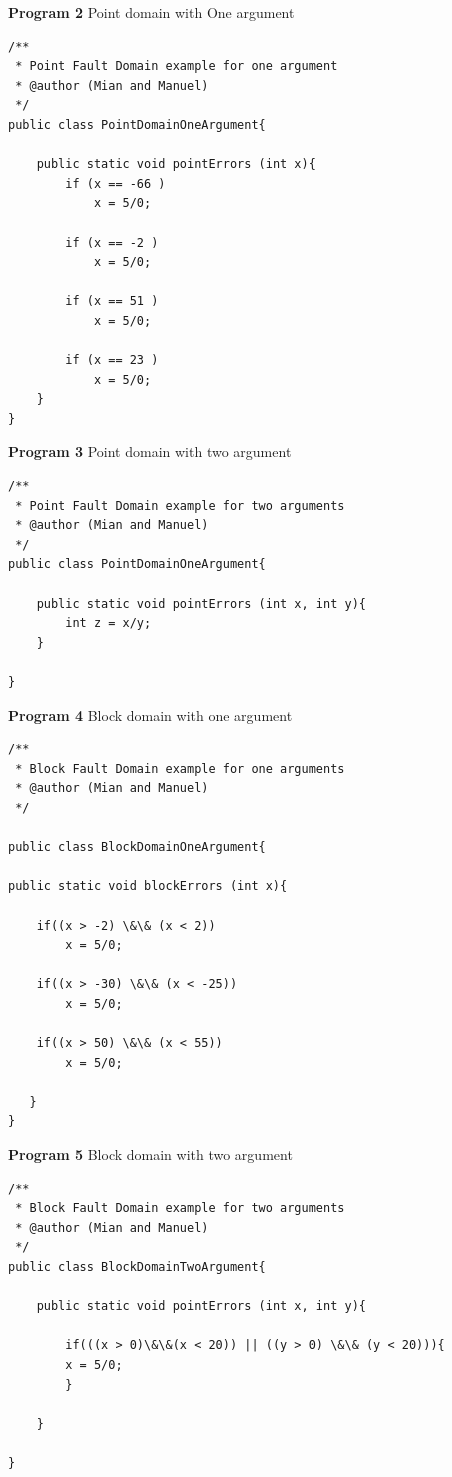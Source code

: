 \documentclass[runningheads,a4paper]{llncs}
\begin{document}
\textbf{Program 2} Point domain with One argument
\begin{lstlisting} 
/**
 * Point Fault Domain example for one argument
 * @author (Mian and Manuel)
 */
public class PointDomainOneArgument{

	public static void pointErrors (int x){
		if (x == -66 )
			x = 5/0;

		if (x == -2 )
			x = 5/0;

		if (x == 51 )
			x = 5/0;

		if (x == 23 )
			x = 5/0;
	}
}
\end{lstlisting}
\textbf{Program 3} Point domain with two argument
\begin{lstlisting}
/**
 * Point Fault Domain example for two arguments
 * @author (Mian and Manuel)
 */
public class PointDomainOneArgument{

	public static void pointErrors (int x, int y){
		int z = x/y;
	}

}
\end{lstlisting}

\textbf{Program 4} Block domain with one argument
\begin{lstlisting}
/**
 * Block Fault Domain example for one arguments
 * @author (Mian and Manuel)
 */

public class BlockDomainOneArgument{

public static void blockErrors (int x){
	
	if((x > -2) \&\& (x < 2))
		x = 5/0;
	
	if((x > -30) \&\& (x < -25))
		x = 5/0;
	
	if((x > 50) \&\& (x < 55))
		x = 5/0;

   }
}

\end{lstlisting}
\textbf{Program 5} Block domain with two argument
\begin{lstlisting}
/**
 * Block Fault Domain example for two arguments
 * @author (Mian and Manuel)
 */
public class BlockDomainTwoArgument{

	public static void pointErrors (int x, int y){

		if(((x > 0)\&\&(x < 20)) || ((y > 0) \&\& (y < 20))){
		x = 5/0;
		}
  	
	}

}
\end{lstlisting}
\end{document}
